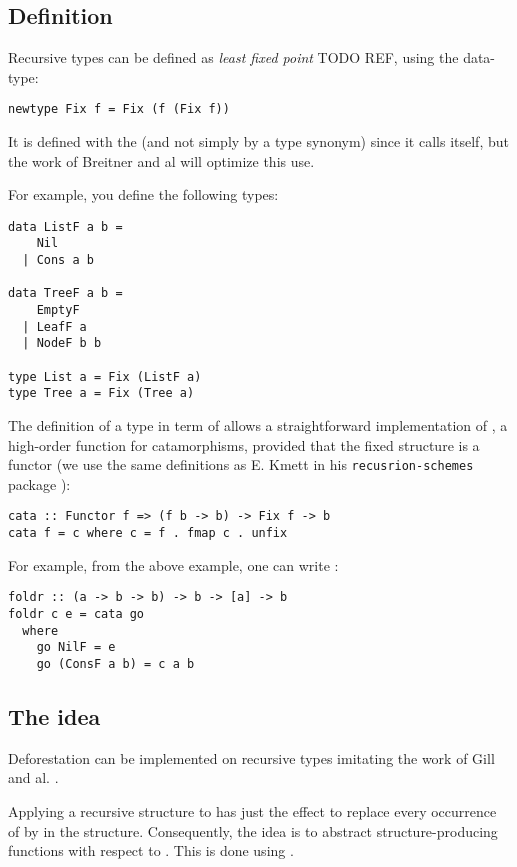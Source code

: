 
\subsection{Definition}
\label{sec:defi}
Recursive types can be defined as \emph{least fixed point} TODO REF, using the  data-type:
\begin{verbatim}
newtype Fix f = Fix (f (Fix f))
\end{verbatim}
It is defined with the  (and not simply by a type synonym) since it calls itself, but the work of Breitner and al \cite{Breitner:2014:SZC:2692915.2628141} will optimize this use.

For example, you define the following types:
\begin{verbatim}
data ListF a b =
    Nil
  | Cons a b
  
data TreeF a b =
    EmptyF
  | LeafF a
  | NodeF b b
  
type List a = Fix (ListF a)
type Tree a = Fix (Tree a)
\end{verbatim}

The definition of a type in term of  allows a straightforward implementation of , a high-order function for catamorphisms, provided that the fixed structure is a functor (we use the same definitions as E. Kmett in his \verb|recusrion-schemes| package \cite{ekmett:eschems}):
\begin{verbatim}
cata :: Functor f => (f b -> b) -> Fix f -> b
cata f = c where c = f . fmap c . unfix
\end{verbatim}

For example,  from the above example, one can write :
\begin{verbatim}
foldr :: (a -> b -> b) -> b -> [a] -> b
foldr c e = cata go
  where
    go NilF = e
    go (ConsF a b) = c a b
\end{verbatim}

\subsection{The idea}
Deforestation can be implemented on recursive types imitating the work of Gill and al. \cite{Gill:1993:SCD:165180.165214}.

Applying a recursive structure to  has just the effect to replace every occurrence of  by  in the structure. Consequently, the idea is to abstract structure-producing functions with respect to . This is done using .

